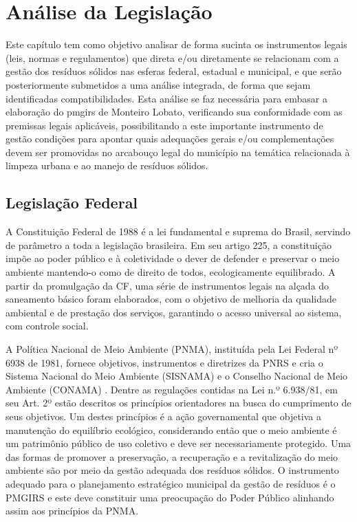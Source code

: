 	\section{Análise da Legislação}
	Este capítulo tem como objetivo analisar de forma sucinta os instrumentos legais (leis, normas e regulamentos) que direta e/ou diretamente se relacionam com a gestão dos resíduos sólidos nas esferas federal, estadual e municipal, e que serão posteriormente submetidos a uma análise integrada, de forma que sejam identificadas compatibilidades. Esta análise se faz necessária para embasar a elaboração do \acrfull{pmgirs} %
	de Monteiro Lobato, verificando sua conformidade com as premissas legais aplicáveis, possibilitando a este importante instrumento de gestão condições para apontar quais adequações gerais e/ou complementações devem ser promovidas no arcabouço legal do município na temática relacionada à limpeza urbana e ao manejo de resíduos sólidos.
	
	\subsection{Legislação Federal}

	A Constituição Federal de 1988 é a lei fundamental e suprema do Brasil, servindo de parâmetro a toda a legislação brasileira. Em seu artigo 225, a constituição impõe ao poder público e à coletividade o dever de defender e preservar o meio ambiente mantendo-o como de direito de todos, ecologicamente equilibrado. A partir da promulgação da CF, uma série de instrumentos legais na alçada do saneamento básico foram elaborados, com o objetivo de melhoria da qualidade ambiental e de prestação dos serviços, garantindo o acesso universal ao sistema, com controle social.
	
	A Política Nacional de Meio Ambiente (PNMA), instituída pela Lei Federal nº 6938 de 1981, fornece objetivos, instrumentos e diretrizes da PNRS e cria o Sistema Nacional do Meio Ambiente (SISNAMA) e o Conselho Nacional de Meio Ambiente (CONAMA) \cite{machado_pnrs_2012}. Dentre as regulações contidas na Lei n.º 6.938/81, em seu Art. 2º estão descritos os princípios orientadores na busca do cumprimento de seus objetivos. Um destes princípios é a ação governamental que objetiva a manutenção do equilíbrio ecológico, considerando então que o meio ambiente é um patrimônio público de uso coletivo e deve ser necessariamente protegido. Uma das formas de promover a preservação, a recuperação e a revitalização do meio ambiente são por meio da gestão adequada dos resíduos sólidos. O instrumento adequado para o planejamento estratégico municipal da gestão de resíduos é o PMGIRS e este deve constituir uma preocupação do Poder Público alinhando assim aos princípios da PNMA.
	
